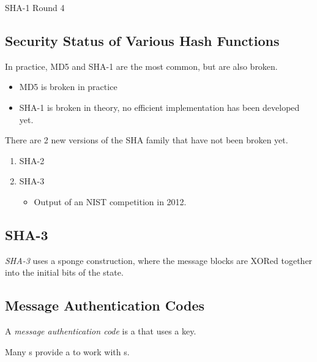 \begin{algorithm}[H]
  \DontPrintSemicolon{}
  \caption{SHA-1 Round 4}
  \label{algo:SHA_1_Round_4}
\end{algorithm}

\subsection{Security Status of Various Hash Functions}\label{subsec:Hash_Functions_Security_Status}
In practice, MD5 and SHA-1 are the most common, but are also broken.
\begin{itemize}[noitemsep]
\item MD5 is broken in practice
\item SHA-1 is broken in theory, no efficient implementation has been developed yet.
\end{itemize}

There are 2 new versions of the SHA family that have not been broken yet.
\begin{enumerate}[noitemsep]
\item SHA-2
\item SHA-3
  \begin{itemize}[noitemsep]
  \item Output of an NIST competition in 2012.
  \end{itemize}
\end{enumerate}

\subsection{SHA-3}\label{subsec:SHA_3}
\begin{definition}[SHA-3]\label{def:SHA_3}
  \emph{SHA-3} uses a sponge construction, where the message blocks are XORed together into the initial bits of the state.
\end{definition}

\subsection{Message Authentication Codes}\label{subsec:MACs}
\begin{definition}\label{def:MAC}
  A \emph{message authentication code} is a  that uses a key.

  \begin{remark}\label{rmk:MAC_Block_Cipher_Relation}
    Many s provide a  to work with s.
  \end{remark}
\end{definition}

